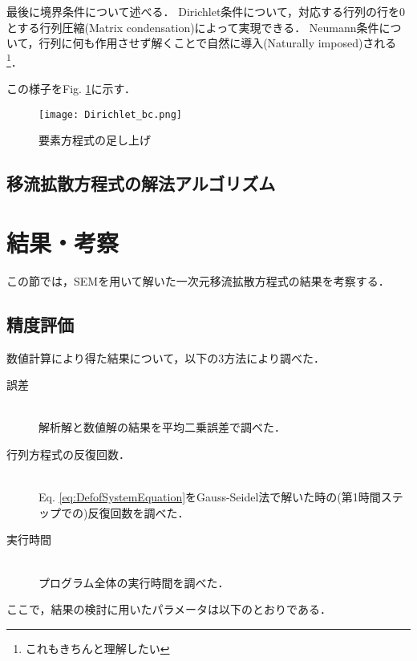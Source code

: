 \documentclass[12pt,a4paper]{jsarticle}
\begin{document}
最後に境界条件について述べる．
Dirichlet条件について，対応する行列の行を0とする行列圧縮(Matrix condensation)によって実現できる．
Neumann条件について，行列に何も作用させず解くことで自然に導入(Naturally imposed)される\footnote{これもきちんと理解したい}．

この様子をFig. \ref{fig:Dirichlet_bc}に示す．
\begin{figure}[h]
  \centering
  \texttt{[image: Dirichlet\_bc.png]}
  \caption{要素方程式の足し上げ}
  \label{fig:Dirichlet_bc}
\end{figure}

\subsection{移流拡散方程式の解法アルゴリズム}


\clearpage
\section{結果・考察}
\label{sec:ResultDiscussion}

この節では，SEMを用いて解いた一次元移流拡散方程式の結果を考察する．

\subsection{精度評価}
\label{subsec:AccuracyEvaluation}

数値計算により得た結果について，以下の3方法により調べた．
\begin{description}
 \item[誤差]\mbox{}\\
	    解析解と数値解の結果を平均二乗誤差で調べた．
 \item[行列方程式の反復回数．]\mbox{}\\
	    Eq. \ref{eq:DefofSystemEquation}をGauss-Seidel法で解いた時の(第1時間ステップでの)反復回数を調べた．
 \item[実行時間]\mbox{}\\
	    プログラム全体の実行時間を調べた．
\end{description}

ここで，結果の検討に用いたパラメータは以下のとおりである．
\end{document}

